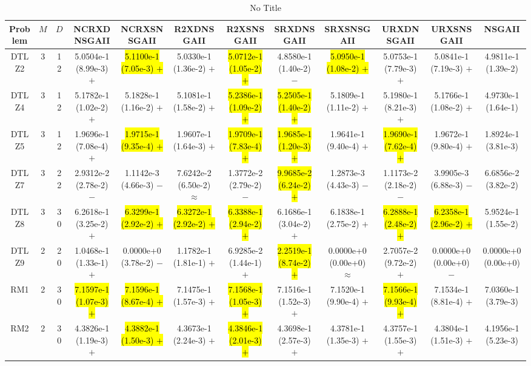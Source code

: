 \documentclass[journal]{IEEEtran}
\begin{document}
\begin{table*}[htbp]
\renewcommand{\arraystretch}{1.2}
\centering
\caption{No Title}
\begin{tabular}{cccccccccccc}
\toprule
Problem&$M$&$D$&NCRXDNSGAII&NCRXSNSGAII&R2XDNSGAII&R2XSNSGAII&SRXDNSGAII&SRXSNSGAII&URXDNSGAII&URXSNSGAII&NSGAII\\
\midrule
\multirow{1}{*}{DTLZ2}&3&12&5.0504e-1 (8.99e-3) $+$&\hl{5.1100e-1 (7.05e-3) $+$}&5.0330e-1 (1.36e-2) $+$&\hl{5.0712e-1 (1.05e-2) $+$}&4.8580e-1 (1.40e-2) $-$&\hl{5.0950e-1 (1.08e-2) $+$}&5.0753e-1 (7.79e-3) $+$&5.0841e-1 (7.19e-3) $+$&4.9811e-1 (1.39e-2)\\
\hline
\multirow{1}{*}{DTLZ4}&3&12&5.1782e-1 (1.02e-2) $+$&5.1828e-1 (1.16e-2) $+$&5.1081e-1 (1.58e-2) $+$&\hl{5.2386e-1 (1.09e-2) $+$}&\hl{5.2505e-1 (1.40e-2) $+$}&5.1809e-1 (1.11e-2) $+$&5.1980e-1 (8.21e-3) $+$&5.1766e-1 (1.08e-2) $+$&4.9730e-1 (1.64e-1)\\
\hline
\multirow{1}{*}{DTLZ5}&3&12&1.9696e-1 (7.08e-4) $+$&\hl{1.9715e-1 (9.35e-4) $+$}&1.9607e-1 (1.64e-3) $+$&\hl{1.9709e-1 (7.83e-4) $+$}&\hl{1.9685e-1 (1.20e-3) $+$}&1.9641e-1 (9.40e-4) $+$&\hl{1.9690e-1 (7.62e-4) $+$}&1.9672e-1 (9.80e-4) $+$&1.8924e-1 (3.81e-3)\\
\hline
\multirow{1}{*}{DTLZ7}&3&22&2.9312e-2 (2.78e-2) $-$&1.1142e-3 (4.66e-3) $-$&7.6242e-2 (6.50e-2) $\approx$&1.3772e-2 (2.79e-2) $-$&\hl{9.9685e-2 (6.24e-2) $+$}&1.2873e-3 (4.43e-3) $-$&1.1173e-2 (2.18e-2) $-$&3.9905e-3 (6.88e-3) $-$&6.6856e-2 (3.82e-2)\\
\hline
\multirow{1}{*}{DTLZ8}&3&30&6.2618e-1 (3.25e-2) $+$&\hl{6.3299e-1 (2.92e-2) $+$}&\hl{6.3272e-1 (2.92e-2) $+$}&\hl{6.3388e-1 (2.94e-2) $+$}&6.1686e-1 (3.04e-2) $+$&6.1838e-1 (2.75e-2) $+$&\hl{6.2888e-1 (2.48e-2) $+$}&\hl{6.2358e-1 (2.96e-2) $+$}&5.9524e-1 (1.55e-2)\\
\hline
\multirow{1}{*}{DTLZ9}&2&20&1.0468e-1 (1.33e-1) $+$&0.0000e+0 (3.78e-2) $-$&1.1782e-1 (1.81e-1) $+$&6.9285e-2 (1.44e-1) $+$&\hl{2.2519e-1 (8.74e-2) $+$}&0.0000e+0 (0.00e+0) $\approx$&2.7057e-2 (9.72e-2) $+$&0.0000e+0 (0.00e+0) $-$&0.0000e+0 (0.00e+0)\\
\hline
\multirow{1}{*}{RM1}&2&30&\hl{7.1597e-1 (1.07e-3) $+$}&\hl{7.1596e-1 (8.67e-4) $+$}&7.1475e-1 (1.57e-3) $+$&\hl{7.1568e-1 (1.05e-3) $+$}&7.1516e-1 (1.52e-3) $+$&7.1520e-1 (9.90e-4) $+$&\hl{7.1566e-1 (9.93e-4) $+$}&7.1534e-1 (8.81e-4) $+$&7.0360e-1 (3.79e-3)\\
\hline
\multirow{1}{*}{RM2}&2&30&4.3826e-1 (1.19e-3) $+$&\hl{4.3882e-1 (1.50e-3) $+$}&4.3673e-1 (2.24e-3) $+$&\hl{4.3846e-1 (2.01e-3) $+$}&4.3698e-1 (2.57e-3) $+$&4.3781e-1 (1.35e-3) $+$&4.3757e-1 (1.55e-3) $+$&4.3804e-1 (1.51e-3) $+$&4.1956e-1 (5.23e-3)\\

\end{tabular}
\end{table*}
\end{document}
